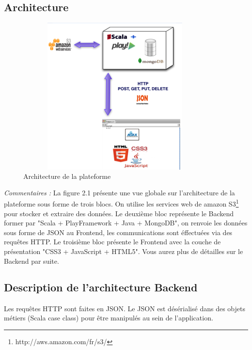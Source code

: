 \subsection{Architecture}
\begin{figure}[H]
        \centering
                \centering
                \includegraphics[width=10cm,height=8cm]{architectureStample.png}
                \caption{Architecture de la plateforme}
                \label{fig:Architecture de la plateforme}
       
\end{figure}
\textit{Commentaires : }
\newline
La figure 2.1 présente une vue globale sur l'architecture de la plateforme sous forme de trois blocs. On utilise les services web de amazon S3\footnote{http://aws.amazon.com/fr/s3/} pour stocker et extraire des données.
\newline
Le deuxième bloc représente le Backend former par "Scala + PlayFramework + Java + MongoDB", on renvoie les données sous forme de JSON au Frontend, les communications sont éffectuées via des requêtes HTTP.
\newline
Le troisième bloc présente le Frontend avec la couche de présentation "CSS3 + JavaScript + HTML5". Vous aurez plus de détailles sur le Backend par suite. 
\subsection{Description de l'architecture Backend}
\paragraph{}
Les requêtes HTTP sont faites en JSON.
Le JSON est désérialisé dans des objets métiers 
(Scala case class) pour être manipulés au sein de l'application.
